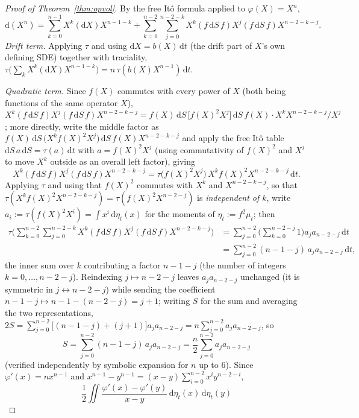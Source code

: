\documentclass[11pt]{article}
\newcommand{\dd}{\mathrm{d}}
\theoremstyle{plain}
\theoremstyle{definition}
\theoremstyle{remark}
\begin{document}
\begin{proof}[Proof of Theorem~\ref{thm:opvol}]
By the free It\^o formula applied to $\varphi(X)=X^n$,
\[
  \dd(X^n) = \sum_{k=0}^{n-1} X^k(\dd X)X^{n-1-k}
  + \sum_{k=0}^{n-2}\sum_{j=0}^{n-2-k} X^k(f\,\dd S\,f)X^j(f\,\dd S\,f)X^{n-2-k-j}.
\]
\emph{Drift term.} Applying $\tau$ and using $\dd X=b(X)\,\dd t$ (the drift part of
$X$'s own defining SDE) together with traciality, $\tau\big(\sum_k X^k(\dd X)
X^{n-1-k}\big)=n\,\tau(b(X)X^{n-1})\,\dd t$.

\emph{Quadratic term.} Since $f(X)$ commutes with every power of $X$ (both being
functions of the same operator $X$), $X^k(f\,\dd S\,f)X^j(f\,\dd S\,f)X^{n-2-k-j}
=f(X)\,\dd S\,\big[f(X)^2X^j\big]\,\dd S\,f(X)\cdot X^k X^{n-2-k-j}/X^j$; more
directly, write the middle factor as $f(X)\,\dd S\,\big(X^k f(X)^2 X^j\big)\,\dd S\,
f(X)X^{n-2-k-j}$ and apply the free It\^o table $\dd S\,a\,\dd S=\tau(a)\,\dd t$ with
$a=f(X)^2X^j$ (using commutativity of $f(X)^2$ and $X^j$ to move $X^k$ outside as an
overall left factor), giving
\[
  X^k(f\,\dd S\,f)X^j(f\,\dd S\,f)X^{n-2-k-j}
  = \tau\big(f(X)^2X^j\big)\,X^kf(X)^2X^{n-2-k-j}\,\dd t.
\]
Applying $\tau$ and using that $f(X)^2$ commutes with $X^k$ and $X^{n-2-k-j}$, so that
$\tau(X^kf(X)^2X^{n-2-k-j})=\tau(f(X)^2X^{n-2-j})$ is \emph{independent of $k$}, write
$a_i:=\tau(f(X)^2X^i)=\int x^i\,\dd\eta_t(x)$ for the moments of $\eta_t:=f^2\mu_t$;
then
\begin{align*}
  \tau\Big(\sum_{k=0}^{n-2}\sum_{j=0}^{n-2-k}X^k(f\,\dd S\,f)X^j(f\,\dd S\,f)X^{n-2-k-j}\Big)
  &= \sum_{j=0}^{n-2}\Big(\sum_{k=0}^{n-2-j}1\Big)a_ja_{n-2-j}\,\dd t\\
  &= \sum_{j=0}^{n-2}(n-1-j)\,a_ja_{n-2-j}\,\dd t,
\end{align*}
the inner sum over $k$ contributing a factor $n-1-j$ (the number of integers
$k=0,\dots,n-2-j$). Reindexing $j\mapsto n-2-j$ leaves $a_ja_{n-2-j}$ unchanged (it is
symmetric in $j\leftrightarrow n-2-j$) while sending the coefficient $n-1-j\mapsto
n-1-(n-2-j)=j+1$; writing $S$ for the sum and averaging the two representations,
$2S=\sum_{j=0}^{n-2}\big[(n-1-j)+(j+1)\big]a_ja_{n-2-j}=n\sum_{j=0}^{n-2}a_ja_{n-2-j}$,
so
\begin{equation}\label{eq:comb}
  S=\sum_{j=0}^{n-2}(n-1-j)\,a_ja_{n-2-j} = \frac n2\sum_{j=0}^{n-2}a_ja_{n-2-j}
\end{equation}
(verified independently by symbolic expansion for $n$ up to $6$). Since
$\varphi'(x)=nx^{n-1}$ and $x^{n-1}-y^{n-1}=(x-y)\sum_{i=0}^{n-2}x^iy^{n-2-i}$,
\[
  \frac12\iint\frac{\varphi'(x)-\varphi'(y)}{x-y}\,\dd\eta_t(x)\,\dd\eta_t(y)
\]
\end{proof}
\end{document}
